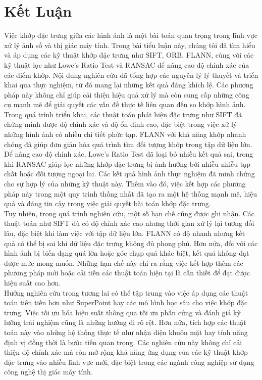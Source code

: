 \newpage
\section{Kết Luận}

Việc khớp đặc trưng giữa các hình ảnh là một bài toán quan trọng trong lĩnh vực xử lý ảnh số và thị giác máy tính. Trong bài tiểu luận này, chúng tôi đã tìm hiểu và áp dụng các kỹ thuật khớp đặc trưng như SIFT, ORB, FLANN, cùng với các kỹ thuật lọc như Lowe’s Ratio Test và RANSAC để nâng cao độ chính xác của các điểm khớp. Nội dung nghiên cứu đã tổng hợp các nguyên lý lý thuyết và triển khai qua thực nghiệm, từ đó mang lại những kết quả đáng khích lệ. Các phương pháp này không chỉ giúp cải thiện hiệu quả xử lý mà còn cung cấp những công cụ mạnh mẽ để giải quyết các vấn đề thực tế liên quan đến so khớp hình ảnh.\\

Trong quá trình triển khai, các thuật toán phát hiện đặc trưng như SIFT đã chứng minh được độ chính xác và độ ổn định cao, đặc biệt trong việc xử lý những hình ảnh có nhiều chi tiết phức tạp. FLANN với khả năng khớp nhanh chóng đã giúp đơn giản hóa quá trình tìm đối tượng khớp trong tập dữ liệu lớn. Để nâng cao độ chính xác, Lowe's Ratio Test đã loại bỏ nhiều kết quả sai, trong khi RANSAC giúp lọc những khớp đặc trưng bị ảnh hưởng bởi nhiễu nhiễu tạp chất hoặc đối tượng ngoại lai. Các kết quả hình ảnh thực nghiệm đã minh chứng cho sự hợp lý của những kỹ thuật này. Thêm vào đó, việc kết hợp các phương pháp này trong một quy trình thống nhất đã tạo ra một hệ thống mạnh mẽ, hiệu quả và đáng tin cậy trong việc giải quyết bài toán khớp đặc trưng.\\


Tuy nhiên, trong quá trình nghiên cứu, một số hạn chế cũng được ghi nhận. Các thuật toán như SIFT dù có độ chính xác cao nhưng thời gian xử lý lại tương đối lâu, đặc biệt khi làm việc với tập dữ liệu lớn. FLANN có độ nhanh nhưng kết quả có thể bị sai khi dữ liệu đặc trưng không đủ phong phú. Hơn nữa, đối với các hình ảnh bị biến dạng quá lớn hoặc góc chụp quá khác biệt, kết quả không đạt được mức mong muốn. Những hạn chế này chỉ ra rằng việc kết hợp thêm các phương pháp mới hoặc cải tiến các thuật toán hiện tại là cần thiết để đạt được hiệu suất cao hơn.\\

Hướng nghiên cứu trong tương lai có thể tập trung vào việc áp dụng các thuật toán tiên tiến hơn như SuperPoint hay các mô hình học sâu cho việc khớp đặc trưng. Việc tối ưu hóa hiệu suất thông qua tối ưu phần cứng và đánh giá kỹ lưỡng trải nghiệm cũng là những hướng đi rõ rệt. Hơn nữa, tích hợp các thuật toán này vào những hệ thống thực tế như nhận diện khuôn mặt hay tính năng định vị đồng thời là bước tiến quan trọng. Các nghiên cứu này không chỉ cải thiện độ chính xác mà còn mở rộng khả năng ứng dụng của các kỹ thuật khớp đặc trưng vào nhiều lĩnh vực mới, đặc biệt trong các ngành công nghiệp sử dụng công nghệ thị giác máy tính.\\

